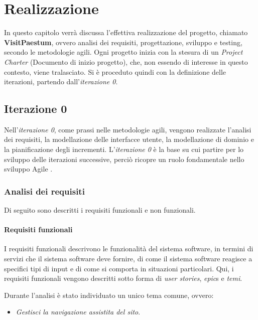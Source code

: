 
\chapter{Realizzazione}
\label{ref:realizzazione}

In questo capitolo verrà discussa l'effettiva realizzazione del progetto, chiamato \textbf{VisitPaestum}, ovvero analisi dei requisiti, progettazione, sviluppo e testing, secondo le metodologie agili.
Ogni progetto inizia con la stesura di un \textit{Project Charter} (Documento di inizio progetto), che, non essendo di interesse in questo contesto, viene tralasciato.
Si è proceduto quindi con la definizione delle iterazioni, partendo dall'\textit{iterazione 0}.

\section{Iterazione 0}

Nell'\emph{iterazione 0}, come prassi nelle metodologie agili, vengono realizzate l'analisi dei requisiti, la modellazione delle interfacce utente, la modellazione di dominio e la pianificazione degli incrementi.
L'\emph{iterazione 0} è la base su cui partire per lo sviluppo delle iterazioni successive, perciò ricopre un ruolo fondamentale nello sviluppo Agile \cite{book:lalonde}.

\subsection{Analisi dei requisiti}
Di seguito sono descritti i requisiti funzionali e non funzionali.

\subsubsection{Requisiti funzionali}
I requisiti funzionali descrivono le funzionalità del sistema software, in termini di servizi che il sistema software deve fornire, di come il sistema software reagisce a specifici tipi di input e di come si comporta in situazioni particolari.
Qui, i requisiti funzionali vengono descritti sotto forma di \textit{user stories}, \textit{epic}s e \textit{temi}.

Durante l'analisi è stato individuato un unico tema comune, ovvero:
\begin{itemize}
\item \textit{Gestisci la navigazione assistita del sito}.
\end{itemize}


